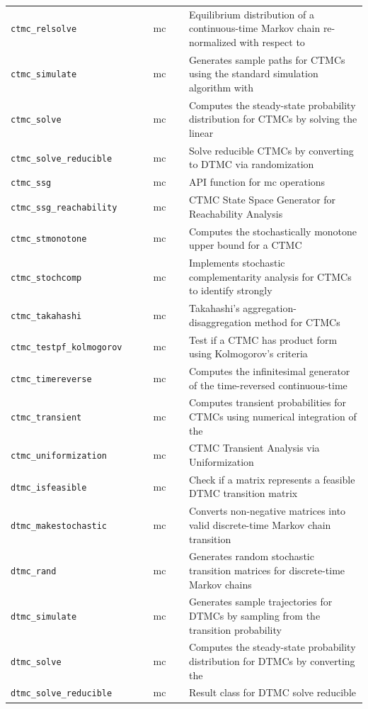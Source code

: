 \begin{footnotesize}
\begin{longtable}{|p{0.4\linewidth}|p{0.1\linewidth}|p{0.5\linewidth}|}
\texttt{ctmc\_relsolve} & mc & Equilibrium distribution of a continuous-time Markov chain re-normalized with respect to\\
\texttt{ctmc\_simulate} & mc & Generates sample paths for CTMCs using the standard simulation algorithm with\\
\texttt{ctmc\_solve} & mc & Computes the steady-state probability distribution for CTMCs by solving the linear\\
\texttt{ctmc\_solve\_reducible} & mc & Solve reducible CTMCs by converting to DTMC via randomization\\
\texttt{ctmc\_ssg} & mc & API function for mc operations\\
\texttt{ctmc\_ssg\_reachability} & mc & CTMC State Space Generator for Reachability Analysis\\
\texttt{ctmc\_stmonotone} & mc & Computes the stochastically monotone upper bound for a CTMC\\
\texttt{ctmc\_stochcomp} & mc & Implements stochastic complementarity analysis for CTMCs to identify strongly\\
\texttt{ctmc\_takahashi} & mc & Takahashi's aggregation-disaggregation method for CTMCs\\
\texttt{ctmc\_testpf\_kolmogorov} & mc & Test if a CTMC has product form using Kolmogorov's criteria\\
\texttt{ctmc\_timereverse} & mc & Computes the infinitesimal generator of the time-reversed continuous-time\\
\texttt{ctmc\_transient} & mc & Computes transient probabilities for CTMCs using numerical integration of the\\
\texttt{ctmc\_uniformization} & mc & CTMC Transient Analysis via Uniformization\\
\texttt{dtmc\_isfeasible} & mc & Check if a matrix represents a feasible DTMC transition matrix\\
\texttt{dtmc\_makestochastic} & mc & Converts non-negative matrices into valid discrete-time Markov chain transition\\
\texttt{dtmc\_rand} & mc & Generates random stochastic transition matrices for discrete-time Markov chains\\
\texttt{dtmc\_simulate} & mc & Generates sample trajectories for DTMCs by sampling from the transition probability\\
\texttt{dtmc\_solve} & mc & Computes the steady-state probability distribution for DTMCs by converting the\\
\texttt{dtmc\_solve\_reducible} & mc & Result class for DTMC solve reducible\\

\end{longtable}
\end{footnotesize}
